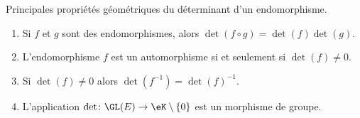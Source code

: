 \begin{proposition}     \label{PropYQNMooZjlYlA}
    Principales propriétés géométriques du déterminant d'un endomorphisme.
    \begin{enumerate}
        \item   \label{ItemUPLNooYZMRJy}
            Si \( f\) et \( g\)  sont des endomorphismes, alors \( \det(f\circ g)=\det(f)\det(g)\).
        \item       \label{ITEMooNZNLooODdXeH}
            L'endomorphisme \( f\) est un automorphisme si et seulement si \( \det(f)\neq 0\).
        \item   \label{ITEMooZMVXooLGjvCy}
            Si \( \det(f)\neq 0\) alors \( \det(f^{-1})=\det(f)^{-1}\).
        \item       \label{ItemooPJVYooYSwqaE}
            L'application \( \det\colon \GL(E)\to \eK\setminus\{ 0 \}\) est un morphisme de groupe.
    \end{enumerate}
\end{proposition}

